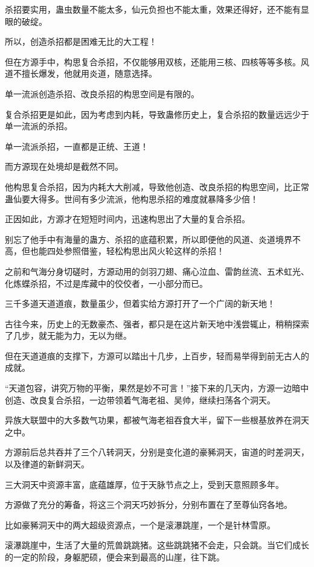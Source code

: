 \begin{this_body}
杀招要实用，蛊虫数量不能太多，仙元负担也不能太重，效果还得好，还不能有显眼的破绽。

所以，创造杀招都是困难无比的大工程！

但在方源手中，构思复合杀招，不仅能够用双核，还能用三核、四核等等多核。风道不擅长爆发，他就用炎道，随意选择。

单一流派创造杀招、改良杀招的构思空间是有限的。

复合杀招更是如此，因为考虑到内耗，导致蛊修历史上，复合杀招的数量远远少于单一流派的杀招。

单一流派杀招，一直都是正统、王道！

而方源现在处境却是截然不同。

他构思复合杀招，因为内耗大大削减，导致他创造、改良杀招的构思空间，比正常蛊仙要大得多。世间有多少流派，他构思杀招的难度就暴降多少倍！

正因如此，方源才在短短时间内，迅速构思出了大量的复合杀招。

别忘了他手中有海量的蛊方、杀招的底蕴积累，所以即便他的风道、炎道境界不高，但也能四处参照借鉴，轻松构思出风火轮这样的杀招！

之前和气海分身切磋时，方源动用的剑羽刀翅、痛心泣血、雷韵丝流、五术虹光、化炼蝶杀招，不过是库藏中的佼佼者，一小部分而已。

三千多道天道道痕，数量虽少，但着实给方源打开了一个广阔的新天地！

古往今来，历史上的无数豪杰、强者，都只是在这片新天地中浅尝辄止，稍稍探索了几步，就无能为力，无以为继。

但在天道道痕的支撑下，方源可以踏出十几步，上百步，轻而易举得到前无古人的成就。

“天道包容，讲究万物的平衡，果然是妙不可言！”接下来的几天内，方源一边暗中创造、改良复合杀招，一边带领着气海老祖、吴帅，继续扫荡各个洞天。

异族大联盟中的大多数气功果，都被气海老祖吞食大半，留下一些根基放养在洞天之中。

方源前后总共吞并了三个八转洞天，分别是变化道的豪豨洞天，宙道的时差洞天，以及律道的新鲜洞天。

三大洞天中资源丰富，底蕴雄厚，位于天脉节点之上，受到天意照顾多年。

方源做了充分的筹备，将这三个洞天巧妙拆分，分别布置在了至尊仙窍各地。

比如豪豨洞天中的两大超级资源点，一个是滚瀑跳崖，一个是针林雪原。

滚瀑跳崖中，生活了大量的荒兽跳跳猪。这些跳跳猪不会走，只会跳。当它们成长的一定的阶段，身躯肥硕，便会来到最高的山崖，往下跳。


\end{this_body}
